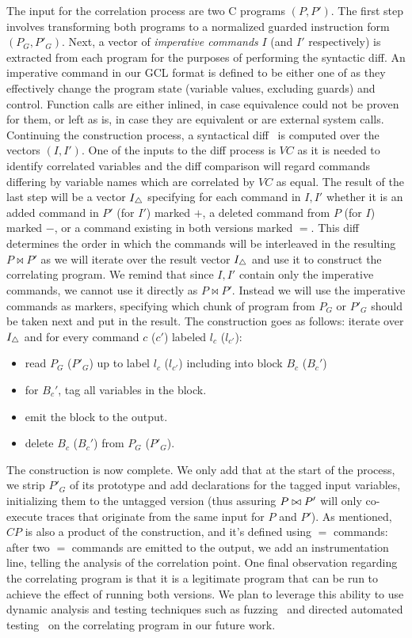 The input for the correlation process are two C programs $(P,P')$. The first step involves transforming both programs to a normalized guarded instruction form $(P_{G},P'_{G})$. Next, a vector of \emph{imperative commands} $I$ (and $I'$ respectively) is extracted from each program for the purposes of performing the syntactic diff. An imperative command in our GCL format is defined to be either one of  as they effectively change the program state (variable values, excluding guards) and control. Function calls are either inlined, in case equivalence could not be proven for them, or left as is, in case they are equivalent or are external system calls. Continuing the construction process, a syntactical diff~\cite{HuntMcIlroy75} is computed over the vectors $(I,I')$. One of the inputs to the diff process is $VC$ as it is needed to identify correlated variables and the diff comparison will regard commands differing by variable names which are correlated by $VC$ as equal. The result of the last step will be a vector $I_{\triangle}$ specifying for each command in $I,I'$ whether it is an added command in $P'$ (for $I'$) marked $+$, a deleted command from $P$ (for $I$) marked $-$, or a command existing in both versions marked $=$. This diff determines the order in which the commands will be interleaved in the resulting $P \bowtie P'$ as we will iterate over the result vector $I_{\triangle}$ and use it to construct the correlating program. We remind that since $I,I'$ contain only the imperative commands, we cannot use it directly as $P \bowtie P'$. Instead we will use the imperative commands as markers, specifying which chunk of program from $P_G$ or $P'_G$ should be taken next and put in the result. The construction goes as follows: iterate over $I_{\triangle}$ and for every command $c$ ($c'$) labeled $l_c$ ($l_{c'}$):
\begin{itemize}
\item read $P_G$ ($P'_G$) up to label $l_c$ ($l_{c'}$) including into block $B_c$ ($B_c'$)
\item for $B_c'$, tag all variables in the block.
\item emit the block to the output.
\item delete $B_c$ ($B_c'$) from $P_G$ ($P'_G$).
\end{itemize}
The construction is now complete. We only add that at the start of the process, we strip $P'_G$ of its prototype and add declarations for the tagged input variables, initializing them to the untagged version (thus assuring $P \bowtie P'$ will only co-execute traces that originate from the same input for $P$ and $P'$).
As mentioned, $CP$ is also a product of the construction, and it's defined using $=$ commands: after two $=$ commands are emitted to the output, we add an instrumentation line, telling the analysis of the correlation point.
One final observation regarding the correlating program is that it is a legitimate program that can be run to achieve the effect of running both versions. We plan to leverage this ability to use dynamic analysis and testing techniques such as fuzzing~\cite{NethercoteSeward07} and directed automated testing~\cite{CadarDunbarEngler08} on the correlating program in our future work.
